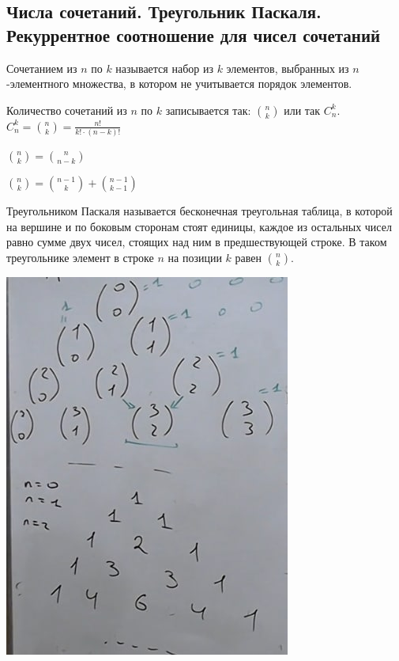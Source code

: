 \subsection{Числа сочетаний. Треугольник Паскаля. Рекуррентное соотношение для чисел сочетаний}

Сочетанием из $n$ по $k$ называется набор из $k$ элементов, выбранных из $n$-элементного множества, в котором не учитывается порядок элементов.

Количество сочетаний из $n$ по $k$ записывается так: $\binom{n}{k}$ или так $C^k_n$. $C^k_n =\binom{n}{k} = \frac{n!}{k!\cdot(n-k)!}$

$\binom{n}{k} = \binom{n}{n-k}$

$\binom{n}{k} = \binom{n-1}{k} + \binom{n-1}{k-1}$

Треугольником Паскаля называется бесконечная треугольная таблица, в которой на вершине и по боковым сторонам стоят единицы, каждое из остальных чисел равно сумме двух чисел, стоящих над ним в предшествующей строке. В таком треугольнике элемент в строке $n$ на позиции $k$ равен $\binom{n}{k}$.

\includegraphics[scale=1]{definitions/images/pascal.png}